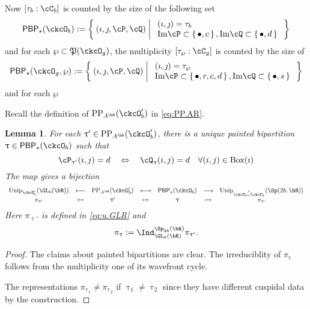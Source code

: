 \documentclass[12pt,a4paper]{amsart}
\def\Im{\operatorname{Im}}
\numberwithin{equation}{section}
\newtheorem{lem}[thm]{Lemma}
\theoremstyle{remark}
\def\Unip{\mathrm{Unip}}
\def\PP{\mathrm{PP}}
\def\BOX#1{\mathrm{Box}(#1)}
\providecommand\mapsfrom{\scalebox{-1}[1]{$\mapsto$}}
\def\Im{\mathrm{Im}}
\def\cuprow{{\stackrel{r}{\sqcup}}}
\def\CPP{\mathfrak{P}}
\def\PBP{\mathsf{PBP}}
\begin{document}
Now $[\tau_{b}:\cC_{b}]$ is counted by the size of the following set
\[
  \PBP_{\star}(\ckcO_b) := \Set{(\imath,\jmath,\cP,\cQ)| %
    \begin{array}{l}
      (\imath,\jmath) = \tau_{b}\\
      \Im \cP \subset \set{\bullet,c}, \Im \cQ \subset\set{\bullet,d}\\
    \end{array}
  }
\]
and for each $\wp\subset \CPP(\ckcO_{g})$, the multiplicity
$[\tau_{\wp}: \cC_{g}]$ is counted by the size of
\[
  \PBP_{\star}(\ckcO_g,\wp):= \Set{(\imath,\jmath,\cP,\cQ)| %
    \begin{array}{l}
      (\imath,\jmath) = \tau_{\wp}\\
      \Im \cP \subset \set{\bullet,r,c,d}, \Im \cQ \subset\set{\bullet, s}\\
    \end{array}
  }
\]
and for each $\wp$

Recall the definition of $\PP_{A^{\bR}}(\ckcO'_{b})$ in  \eqref{eq:PP.AR}.

\begin{lem}
  For each $\uptau' \in \PP_{A^{\bR}}(\ckcO'_{b})$, there is a unique painted
  bipartition $\uptau\in \PBP_{\star}(\ckcO_{b})$ such that
  \[
    \cP_{\uptau'}(i,j) = d \quad %
    \Leftrightarrow
    \quad
    \cQ_{\uptau}(i,j) = d \quad \forall (i,j)\in \BOX{\imath}\\
  \]
  The map gives a bijection
  \[
    \begin{array}{ccccccc}
      \Unip_{\ckcO'_{b}}(\GL_{b}(\bR))&\longleftarrow
      &\PP_{A^{\bR}}(\ckcO'_{b}) & \longleftrightarrow
      & \PBP_{\star}(\ckcO_{b}) & \longrightarrow
      & \Unip_{\ckcO_{b}\cuprow \ckcO_{1}}(\Sp(2b,\bR))\\
      \pi_{\uptau'} & \mapsfrom & \uptau' & \mapsto
      & \uptau & \mapsto & \pi_{\uptau}.
    \end{array}
  \]
  Here $\pi_{\uptau'}$ is defined in \eqref{eq:u.GLR} and
  \[
    \pi_{\uptau} := \Ind_{\GL_{b}(\bR)}^{\Sp_{2b}(\bR)} \pi_{\uptau'}.
  \]
\end{lem}
\begin{proof}
  The claims about painted bipartitions are clear.
  The irreduciblity of $\pi_{\uptau}$ follows from the multiplicity one
  of its wavefront cycle.

  The representations $\pi_{\uptau_{1}}\neq \pi_{\uptau_{2}}$ if
  $\uptau_{1}\neq \uptau_{2}$ since they have different cuspidal data by the
  construction.
\end{proof}
\end{document}
